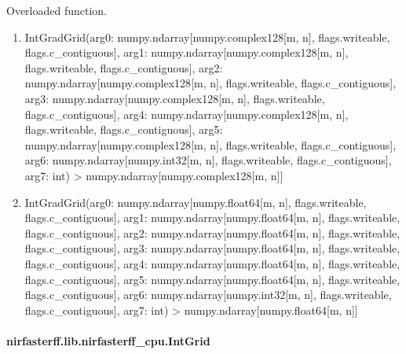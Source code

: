 \documentclass[letterpaper,10pt,english]{sphinxmanual}
\begin{document}
\begin{fulllineitems}
\label{\detokenize{_autosummary/nirfasterff.lib.nirfasterff_cpu.IntGradGrid:nirfasterff.lib.nirfasterff_cpu.IntGradGrid}}
\pysigstartsignatures
\pysiglinewithargsret
{}
{\sphinxparamcomma {}}
{}
\pysigstopsignatures
\sphinxAtStartPar
Overloaded function.
\begin{enumerate}
%
\item {} 
\sphinxAtStartPar
IntGradGrid(arg0: numpy.ndarray{[}numpy.complex128{[}m, n{]}, flags.writeable, flags.c\_contiguous{]}, arg1: numpy.ndarray{[}numpy.complex128{[}m, n{]}, flags.writeable, flags.c\_contiguous{]}, arg2: numpy.ndarray{[}numpy.complex128{[}m, n{]}, flags.writeable, flags.c\_contiguous{]}, arg3: numpy.ndarray{[}numpy.complex128{[}m, n{]}, flags.writeable, flags.c\_contiguous{]}, arg4: numpy.ndarray{[}numpy.complex128{[}m, n{]}, flags.writeable, flags.c\_contiguous{]}, arg5: numpy.ndarray{[}numpy.complex128{[}m, n{]}, flags.writeable, flags.c\_contiguous{]}, arg6: numpy.ndarray{[}numpy.int32{[}m, n{]}, flags.writeable, flags.c\_contiguous{]}, arg7: int) \sphinxhyphen{}\textgreater{} numpy.ndarray{[}numpy.complex128{[}m, n{]}{]}

\item {} 
\sphinxAtStartPar
IntGradGrid(arg0: numpy.ndarray{[}numpy.float64{[}m, n{]}, flags.writeable, flags.c\_contiguous{]}, arg1: numpy.ndarray{[}numpy.float64{[}m, n{]}, flags.writeable, flags.c\_contiguous{]}, arg2: numpy.ndarray{[}numpy.float64{[}m, n{]}, flags.writeable, flags.c\_contiguous{]}, arg3: numpy.ndarray{[}numpy.float64{[}m, n{]}, flags.writeable, flags.c\_contiguous{]}, arg4: numpy.ndarray{[}numpy.float64{[}m, n{]}, flags.writeable, flags.c\_contiguous{]}, arg5: numpy.ndarray{[}numpy.float64{[}m, n{]}, flags.writeable, flags.c\_contiguous{]}, arg6: numpy.ndarray{[}numpy.int32{[}m, n{]}, flags.writeable, flags.c\_contiguous{]}, arg7: int) \sphinxhyphen{}\textgreater{} numpy.ndarray{[}numpy.float64{[}m, n{]}{]}

\end{enumerate}

\end{fulllineitems}


\sphinxstepscope


\paragraph{nirfasterff.lib.nirfasterff\_cpu.IntGrid}
\label{\detokenize{_autosummary/nirfasterff.lib.nirfasterff_cpu.IntGrid:nirfasterff-lib-nirfasterff-cpu-intgrid}}\label{\detokenize{_autosummary/nirfasterff.lib.nirfasterff_cpu.IntGrid::doc}}
\end{document}
